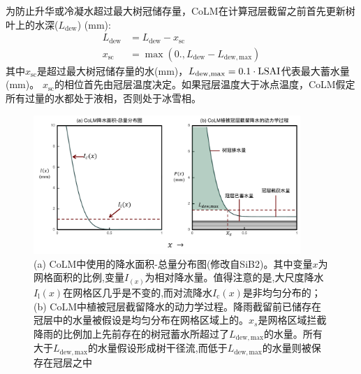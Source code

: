 为防止升华或冷凝水超过最大树冠储存量，CoLM在计算冠层截留之前首先更新树叶上的水深($L_{\mathrm{dew}}$) (mm):
\begin{equation}
  \begin{aligned}
    L_{\mathrm{dew}} &= L_{\mathrm{dew}}-x_{\mathrm{sc}} \\
    x_{\mathrm{sc}} &= \max\left(0., L_{\mathrm{dew}}-L_{\mathrm {dew,max}}\right)
  \end{aligned}
\end{equation}
其中$x_{\mathrm{sc}}$是超过最大树冠储存量的水(mm)，$L_{\mathrm {dew,max}} =0.1 \cdot{\rm LSAI}$代表最大蓄水量(mm)。
$x_{\mathrm{sc}}$的相位首先由冠层温度决定。如果冠层温度大于冰点温度，CoLM假定所有过量的水都处于液相，否则处于冰雪相。
{
  \begin{figure}[htbp]
    \centering
    \includegraphics[width=0.9\textwidth]{Figures/植被冠层和土壤水分/CoLM冠层截留示意图-new.pdf}
    \caption[(a) CoLM中使用的降水面积-总量分布图；(b) CoLM中植被冠层截留降水的动力学过程]{(a) CoLM中使用的降水面积-总量分布图(修改自SiB2)。其中变量$x$为网格面积的比例,变量$I_{\left(x\right)}$为相对降水量。值得注意的是,大尺度降水$I_{\mathrm {l}} \left(x\right)$在网格区几乎是不变的,而对流降水$I_{\mathrm {c}} \left(x\right)$是非均匀分布的；(b) CoLM中植被冠层截留降水的动力学过程。降雨截留前已储存在冠层中的水量被假设是均匀分布在网格区域上的。$x_s$是网格区域拦截降雨的比例加上先前存在的树冠蓄水所超过了$L_{\mathrm {dew,max}}$的水量。所有大于$L_{\mathrm {dew,max}}$的水量假设形成树干径流,而低于$L_{\mathrm {dew,max}}$的水量则被保存在冠层之中}
    \label{fig:CoLM冠层截留示意图}
  \end{figure}
}

